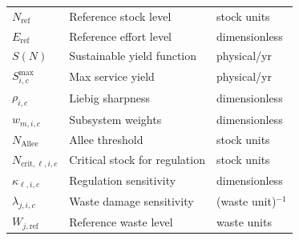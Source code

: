 \documentclass[twocolumn,10pt]{article}
\begin{document}
\begin{table}[t]
\begin{tabularx}{\textwidth}{l X l}
\(N_{\text{ref}}\) & Reference stock level & stock units \\
\(E_{\text{ref}}\) & Reference effort level & dimensionless \\
\(S(N)\) & Sustainable yield function & physical/yr \\
\(S^{\max}_{i,c}\) & Max service yield & physical/yr \\
\(\rho_{i,c}\) & Liebig sharpness & dimensionless \\
\(w_{m,i,c}\) & Subsystem weights & dimensionless \\
\(N_{\mathrm{Allee}}\) & Allee threshold & stock units \\
\(N_{\mathrm{crit},\ell,i,c}\) & Critical stock for regulation & stock units \\
\(\kappa_{\ell,i,c}\) & Regulation sensitivity & dimensionless \\
\(\lambda_{j,i,c}\) & Waste damage sensitivity & (waste unit)\(^{-1}\) \\
\(W_{j,\mathrm{ref}}\) & Reference waste level & waste units \\
\bottomrule
\end{tabularx}
\end{table}
\end{document}
